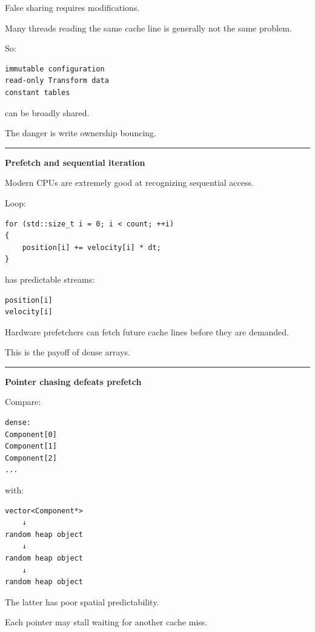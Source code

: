 False sharing requires modifications.

Many threads reading the same cache line is generally not the same problem.

So:

\begin{verbatim}
immutable configuration
read-only Transform data
constant tables
\end{verbatim}

can be broadly shared.

The danger is write ownership bouncing.

\begin{center}\rule{0.5\linewidth}{0.5pt}\end{center}

\textbf{Prefetch and sequential iteration}

Modern CPUs are extremely good at recognizing sequential access.

Loop:

\begin{verbatim}
for (std::size_t i = 0; i < count; ++i)
{
    position[i] += velocity[i] * dt;
}
\end{verbatim}

has predictable streams:

\begin{verbatim}
position[i]
velocity[i]
\end{verbatim}

Hardware prefetchers can fetch future cache lines before they are demanded.

This is the payoff of dense arrays.

\begin{center}\rule{0.5\linewidth}{0.5pt}\end{center}

\textbf{Pointer chasing defeats prefetch}

Compare:

\begin{verbatim}
dense:
Component[0]
Component[1]
Component[2]
...
\end{verbatim}

with:

\begin{verbatim}
vector<Component*>
    ↓
random heap object
    ↓
random heap object
    ↓
random heap object
\end{verbatim}

The latter has poor spatial predictability.

Each pointer may stall waiting for another cache miss.

